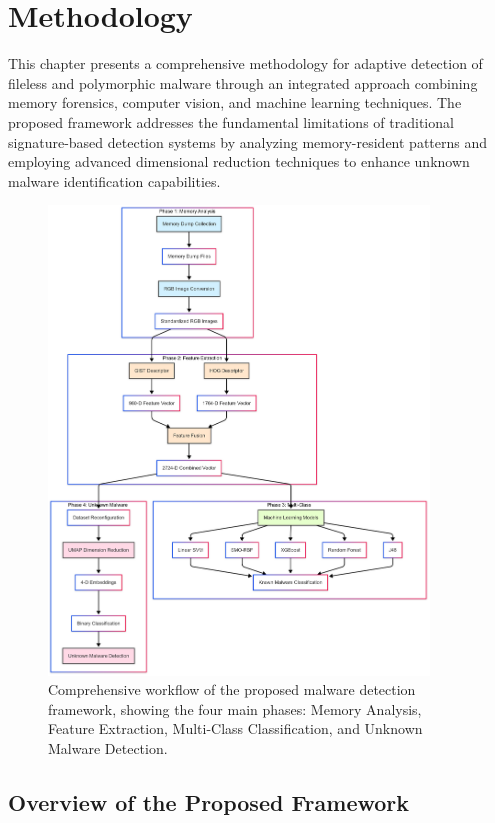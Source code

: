 \chapter{Methodology}
\label{ch:methodology}

This chapter presents a comprehensive methodology for adaptive detection of fileless and polymorphic malware through an integrated approach combining memory forensics, computer vision, and machine learning techniques. The proposed framework addresses the fundamental limitations of traditional signature-based detection systems by analyzing memory-resident patterns and employing advanced dimensional reduction techniques to enhance unknown malware identification capabilities.


\begin{figure}[!htbp]
    \centering
    \includegraphics[width=0.9\textwidth]{figures/methodology.png}
    \caption{Comprehensive workflow of the proposed malware detection framework, showing the four main phases: Memory Analysis, Feature Extraction, Multi-Class Classification, and Unknown Malware Detection.}
    \label{fig:methodology-overview}
\end{figure}

\section{Overview of the Proposed Framework}
\label{sec:methodology-overview}

